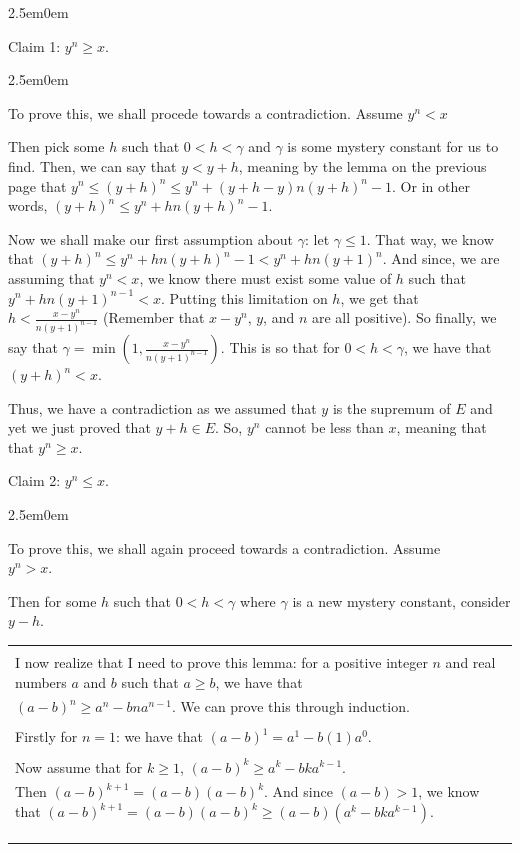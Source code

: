 \documentclass{book}
\newcommand{\hThree}{%
   \color{PineGreen}
   \fontsize{13}{15}\selectfont%
}
\newcommand{\hFour}{%
   \color{Cerulean}
   \fontsize{12}{14}\selectfont%
}
\newenvironment{myIndent}{%
   \begin{adjustwidth}{2.5em}{0em}%
}{%
   \end{adjustwidth}%
}
\newcommand{\uuline}[2][.]{%
{\vphantom{a}\color{#1}%
\rlap{\rule[-0.18em]{\widthof{#2}}{0.06em}}%
\rlap{\rule[-0.32em]{\widthof{#2}}{0.06em}}}%
#2}
\newcommand{\retTwo}{\hfill\bigbreak}
\newenvironment{myClosureOneDeprecated}[2][.]{%
   \color{#1}%
   \begin{tabular}{|p{#2in}|} \hline \\%
}{%
   \\ \\ \hline \end{tabular}%
}
\begin{document}
{\begin{myIndent}
      \uuline{Claim 1}: $y^n \geq x$.
      
      {\begin{myIndent} \hThree
         To prove this, we shall procede towards a contradiction. Assume $y^n<x$\retTwo
         
         Then pick some $h$ such that $0<h<\gamma$ and $\gamma$ is some mystery constant for us to find. Then, we can say that $y<y+h$, meaning by the lemma on the previous page that $y^n \leq (y+h)^n \leq y^n + (y+h-y)n(y+h)^n-1$. Or in other words, $(y+h)^n \leq y^n + hn(y+h)^n-1$. \retTwo

         Now we shall make our first assumption about $\gamma$: let $\gamma \leq 1$. That way, we know that $(y+h)^n \leq y^n + hn(y+h)^n-1 < y^n + hn(y+1)^n$. And since, we are assuming that $y^n<x$, we know there must exist some value of $h$ such that $y^n + hn(y+1)^{n-1} < x$. Putting this limitation on $h$, we get that $h < \frac{x - y^n}{n(y+1)^{n-1}}$ (Remember that $x-y^n$, $y$, and $n$ are all positive). So finally, we say that $\gamma = \min{\left( 1, \frac{x - y^n}{n(y+1)^{n-1}} \right)}$. This is so that for $0<h<\gamma$, we have that $(y+h)^n < x$. \retTwo

         Thus, we have a contradiction as we assumed that $y$ is the supremum of $E$ and yet we just proved that $y+h \in E$. So, $y^n$ cannot be less than $x$, meaning that that $y^n \geq x$. \retTwo
      \end{myIndent}}

      \uuline{Claim 2}: $y^n \leq x$.
      
      {\begin{myIndent} \hThree
         To prove this, we shall again proceed towards a contradiction. Assume \\$y^n>x$. \retTwo

         Then for some $h$ such that $0<h<\gamma$ where $\gamma$ is a new mystery constant, consider $y-h$. \retTwo

         
         {\begin{center} \hFour
            \begin{myClosureOneDeprecated}{5}
               I now realize that I need to prove this lemma: for a positive integer $n$ and real numbers $a$ and $b$ such that $a \geq b$, we have that \\$(a-b)^n \geq a^n-bna^{n-1}$. We can prove this through induction. \\ \\
               Firstly for $n=1$: we have that $(a-b)^1 = a^1 - b(1)a^0$. \\ \\
               Now assume that for $k\geq 1$, $(a-b)^k \geq a^k - bka^{k-1}$.\\ Then $(a-b)^{k+1} = (a-b)(a-b)^k$. And since $(a-b)>1$, we know that $(a-b)^{k+1} = (a-b)(a-b)^k \geq (a-b)(a^k - bka^{k-1})$. \\ \\


\end{myClosureOneDeprecated}
\end{center}}
\end{myIndent}}
\end{myIndent}}
\end{document}
